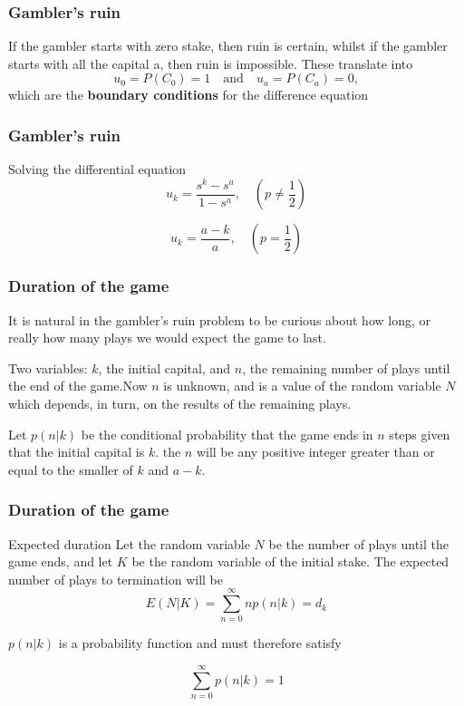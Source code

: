 \documentclass[spanish]{beamer}
\begin{document}
\begin{frame}
\frametitle{Gambler’s ruin}
If the gambler starts with zero stake, then ruin is certain, whilst if the gambler starts with all the capital a, then ruin is impossible. These translate into
\begin{equation*}
u_{0} = P(C_{0}) = 1 \quad \text{and} \quad u_{a} = P(C_{a}) = 0,
\end{equation*}
which are the \textbf{boundary conditions} for the difference equation
\end{frame}
\begin{frame}
\frametitle{Gambler’s ruin}
Solving the differential equation
\begin{equation*}
u_{k}=\frac{s^k-s^a}{1-s^a}, \quad (p\neq \frac{1}{2} )
\end{equation*}

\begin{equation*}
u_{k}=\frac{a-k}{a}, \quad (p= \frac{1}{2} )
\end{equation*}

\end{frame}
\begin{frame}
\frametitle{Duration of the game}
It is natural in the gambler’s ruin problem to be curious about how long, or really
how many plays we would expect the game to last.\vspace{1em}


Two variables: $k$, the initial capital, and $n$, the remaining number of plays until the end of the game.Now $n$ is unknown, and is a value of the random variable $N$ which depends, in turn, on the results of the remaining plays.\vspace{1em}


Let $p(n\vert k)$ be the conditional probability that the game ends in $n$ steps given that the initial capital is $k$. the $n$ will be any positive integer greater than or equal to the smaller of $k$ and $a - k$.
\end{frame}
\begin{frame}
\frametitle{Duration of the game}
\begin{block}{Expected duration}
Let the random variable $N$ be the number of plays until the game ends, and let $K$ be the random variable of the initial stake. The expected number of plays to termination will be 
\begin{equation*}
E(N\vert K)= \sum_{n=0}^{\infty}{np(n\vert k)}=d_{k}
\end{equation*}
\end{block}
$p(n\vert k)$ is a probability function and must therefore satisfy

\begin{equation*}
\sum_{n=0}^{\infty}{p(n\vert k)}=1
\end{equation*}
\end{frame}
\end{document}
